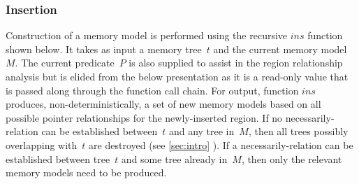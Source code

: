 \subsubsection{Insertion}
Construction of a memory model is performed
using the recursive $\mathit{ins}$ function shown below.
It takes as input a memory tree~$t$ and the current memory model~$M$.
The current predicate~$P$ is also supplied
to assist in the region relationship analysis
but is elided from the below presentation as it is a read-only value
that is passed along through the function call chain.
For output, function $\mathit{ins}$ produces, non-deterministically,
a set of new memory models based on all possible pointer relationships
for the newly-inserted region.
If no necessarily-relation can be established between~$t$ and any tree in~$M$, then all trees possibly overlapping with~$t$ are destroyed (see \cref{sec:intro} ).
If a necessarily-relation can be established between tree~$t$ and some tree already in~$M$, then only the relevant memory models need to be produced.


